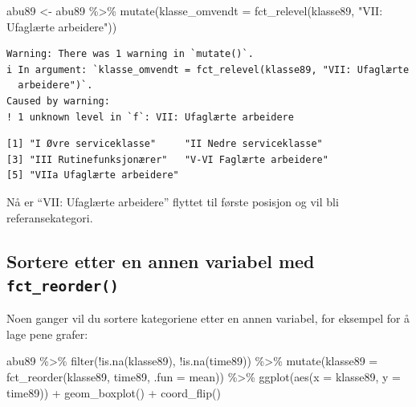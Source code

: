 \documentclass[
  norsk,
  letterpaper,
  DIV=11,
  numbers=noendperiod]{scrreprt}
\newenvironment{Shaded}{\begin{snugshade}}{\end{snugshade}}
\newcommand{\AttributeTok}[1]{\textcolor[rgb]{0.40,0.45,0.13}{#1}}
\newcommand{\FunctionTok}[1]{\textcolor[rgb]{0.28,0.35,0.67}{#1}}
\newcommand{\NormalTok}[1]{\textcolor[rgb]{0.00,0.23,0.31}{#1}}
\newcommand{\OtherTok}[1]{\textcolor[rgb]{0.00,0.23,0.31}{#1}}
\newcommand{\SpecialCharTok}[1]{\textcolor[rgb]{0.37,0.37,0.37}{#1}}
\newcommand{\StringTok}[1]{\textcolor[rgb]{0.13,0.47,0.30}{#1}}
\theoremstyle{definition}
\theoremstyle{remark}
\begin{document}
\begin{Shaded}
\begin{Highlighting}[]
\NormalTok{abu89 }\OtherTok{\textless{}{-}}\NormalTok{ abu89 }\SpecialCharTok{\%\textgreater{}\%}
  \FunctionTok{mutate}\NormalTok{(}\AttributeTok{klasse\_omvendt =} \FunctionTok{fct\_relevel}\NormalTok{(klasse89, }\StringTok{"VII: Ufaglærte arbeidere"}\NormalTok{))}
\end{Highlighting}
\end{Shaded}

\begin{verbatim}
Warning: There was 1 warning in `mutate()`.
i In argument: `klasse_omvendt = fct_relevel(klasse89, "VII: Ufaglærte
  arbeidere")`.
Caused by warning:
! 1 unknown level in `f`: VII: Ufaglærte arbeidere
\end{verbatim}

\begin{Shaded}
\end{Shaded}

\begin{verbatim}
[1] "I Øvre serviceklasse"     "II Nedre serviceklasse"  
[3] "III Rutinefunksjonærer"   "V-VI Faglærte arbeidere" 
[5] "VIIa Ufaglærte arbeidere"
\end{verbatim}

Nå er ``VII: Ufaglærte arbeidere'' flyttet til første posisjon og vil
bli referansekategori.

\subsection{\texorpdfstring{Sortere etter en annen variabel med
\texttt{fct\_reorder()}}{Sortere etter en annen variabel med fct\_reorder()}}\label{sortere-etter-en-annen-variabel-med-fct_reorder}

Noen ganger vil du sortere kategoriene etter en annen variabel, for
eksempel for å lage pene grafer:

\begin{Shaded}
\begin{Highlighting}[]
\NormalTok{abu89 }\SpecialCharTok{\%\textgreater{}\%}
  \FunctionTok{filter}\NormalTok{(}\SpecialCharTok{!}\FunctionTok{is.na}\NormalTok{(klasse89), }\SpecialCharTok{!}\FunctionTok{is.na}\NormalTok{(time89)) }\SpecialCharTok{\%\textgreater{}\%}
  \FunctionTok{mutate}\NormalTok{(}\AttributeTok{klasse89 =} \FunctionTok{fct\_reorder}\NormalTok{(klasse89, time89, }\AttributeTok{.fun =}\NormalTok{ mean)) }\SpecialCharTok{\%\textgreater{}\%}
  \FunctionTok{ggplot}\NormalTok{(}\FunctionTok{aes}\NormalTok{(}\AttributeTok{x =}\NormalTok{ klasse89, }\AttributeTok{y =}\NormalTok{ time89)) }\SpecialCharTok{+}
  \FunctionTok{geom\_boxplot}\NormalTok{() }\SpecialCharTok{+}
  \FunctionTok{coord\_flip}\NormalTok{()}
\end{Highlighting}
\end{Shaded}
\end{document}
